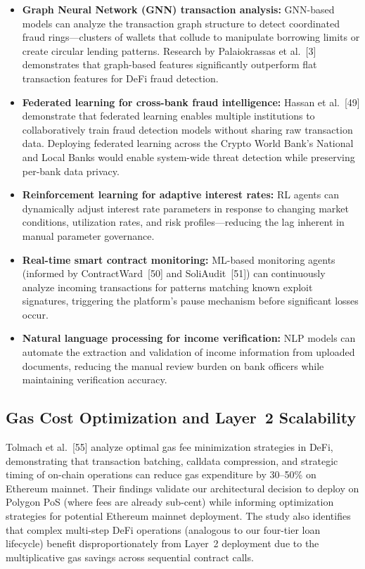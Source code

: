 \documentclass[12pt,a4paper]{report}
\begin{document}
\begin{itemize}[noitemsep]
\item \textbf{Graph Neural Network (GNN) transaction analysis:} GNN-based models can analyze the transaction graph structure to detect coordinated fraud rings---clusters of wallets that collude to manipulate borrowing limits or create circular lending patterns. Research by Palaiokrassas et al.~[3] demonstrates that graph-based features significantly outperform flat transaction features for DeFi fraud detection.

\item \textbf{Federated learning for cross-bank fraud intelligence:} Hassan et al.~[49] demonstrate that federated learning enables multiple institutions to collaboratively train fraud detection models without sharing raw transaction data. Deploying federated learning across the Crypto World Bank's National and Local Banks would enable system-wide threat detection while preserving per-bank data privacy.

\item \textbf{Reinforcement learning for adaptive interest rates:} RL agents can dynamically adjust interest rate parameters in response to changing market conditions, utilization rates, and risk profiles---reducing the lag inherent in manual parameter governance.

\item \textbf{Real-time smart contract monitoring:} ML-based monitoring agents (informed by ContractWard~[50] and SoliAudit~[51]) can continuously analyze incoming transactions for patterns matching known exploit signatures, triggering the platform's pause mechanism before significant losses occur.

\item \textbf{Natural language processing for income verification:} NLP models can automate the extraction and validation of income information from uploaded documents, reducing the manual review burden on bank officers while maintaining verification accuracy.
\end{itemize}

\subsection{Gas Cost Optimization and Layer~2 Scalability}

Tolmach et al.~[55] analyze optimal gas fee minimization strategies in DeFi, demonstrating that transaction batching, calldata compression, and strategic timing of on-chain operations can reduce gas expenditure by 30--50\% on Ethereum mainnet. Their findings validate our architectural decision to deploy on Polygon PoS (where fees are already sub-cent) while informing optimization strategies for potential Ethereum mainnet deployment. The study also identifies that complex multi-step DeFi operations (analogous to our four-tier loan lifecycle) benefit disproportionately from Layer~2 deployment due to the multiplicative gas savings across sequential contract calls.
\end{document}

